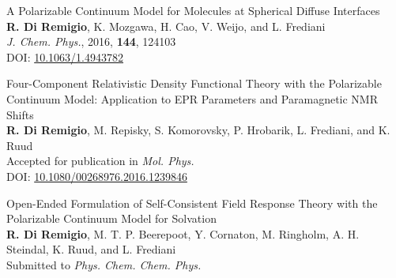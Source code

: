 {\Large
\noindent\textsf{A Polarizable Continuum Model for Molecules at Spherical
Diffuse Interfaces
}
\\
    \textbf{R. Di Remigio}, K. Mozgawa, H. Cao, V. Weijo, and L.
    Frediani
\\
    \textit{J. Chem. Phys.}, \textrm{2016}, \textbf{144}, 124103
  \\
  DOI: \url{10.1063/1.4943782}
}
\vspace*{\fill}



\thispagestyle{empty}
\vspace*{\fill}
\begin{flushright}
{\Huge{}}
\end{flushright}

{\Large
\noindent\textsf{Four-Component Relativistic Density Functional Theory with the
Polarizable Continuum Model: Application to EPR Parameters
and Paramagnetic NMR Shifts
}
\\
  \textbf{R. Di Remigio}, M. Repisky, S. Komorovsky, P. Hrobarik, L.
  Frediani, and K. Ruud
\\
  Accepted for publication in \textit{Mol. Phys.}
  \\
  DOI: \url{10.1080/00268976.2016.1239846}
}
\vspace*{\fill}



\thispagestyle{empty}
\vspace*{\fill}
\begin{flushright}
{\Huge{}}
\end{flushright}

{\Large
\noindent\textsf{Open-Ended Formulation of Self-Consistent Field Response Theory with
the Polarizable Continuum Model for Solvation
}
\\
    \textbf{R. Di Remigio}, M. T. P. Beerepoot, Y. Cornaton, M. Ringholm,
    A. H. Steindal, K. Ruud, and L. Frediani
\\
    Submitted to \textit{Phys. Chem. Chem. Phys.}
}
\vspace*{\fill}


